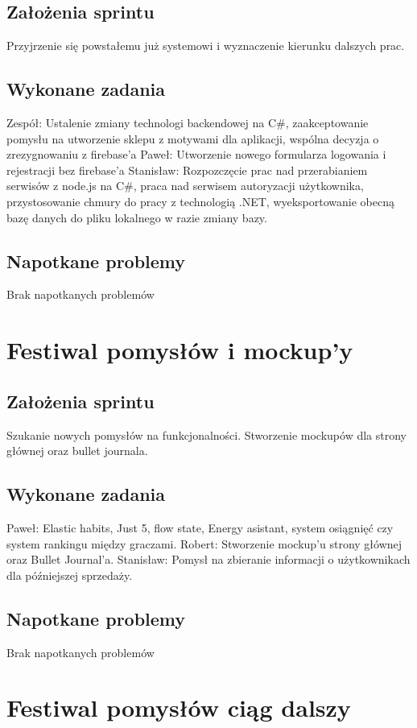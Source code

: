 \documentclass[a4paper,11pt]{report}
\begin{document}
\subsection {Założenia sprintu}
Przyjrzenie się powstałemu już systemowi i wyznaczenie kierunku dalszych prac.
\subsection {Wykonane zadania}
Zespół: Ustalenie zmiany technologi backendowej na C\#, zaakceptowanie pomysłu na utworzenie sklepu z motywami dla aplikacji, wspólna decyzja o zrezygnowaniu z firebase'a
Paweł: Utworzenie nowego formularza logowania i rejestracji bez firebase'a
Stanisław: Rozpozczęcie prac nad przerabianiem serwisów z node.js na C\#, praca nad serwisem autoryzacji użytkownika, przystosowanie chmury do pracy z technologią .NET, wyeksportowanie obecną bazę danych do pliku lokalnego w razie zmiany bazy.
\subsection {Napotkane problemy}
Brak napotkanych problemów

\section {Festiwal pomysłów i mockup'y}
\subsection {Założenia sprintu}
Szukanie nowych pomysłów na funkcjonalności. Stworzenie mockupów dla strony głównej oraz bullet journala. 
\subsection {Wykonane zadania}
Paweł: Elastic habits, Just 5, flow state, Energy asistant, system osiągnięć czy system rankingu między graczami.
Robert: Stworzenie mockup'u strony głównej oraz Bullet Journal'a.
Stanisław: Pomysł na zbieranie informacji o użytkownikach dla późniejszej sprzedaży.
\subsection {Napotkane problemy}
Brak napotkanych problemów

\section {Festiwal pomysłów ciąg dalszy}
\end{document}
